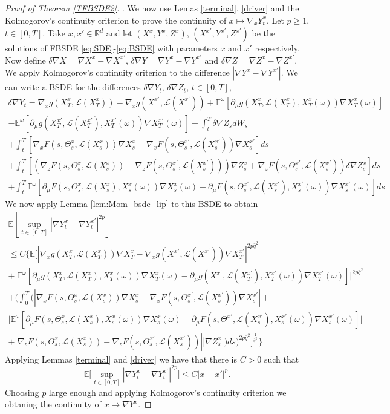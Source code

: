 \documentclass[12,english]{amsart}
\theoremstyle{plain}
\theoremstyle{definition}
\theoremstyle{plain}
\theoremstyle{plain}
\theoremstyle{remark}
\newcommand{\E}{\mathbb E}
\newcommand{\R}{\mathbb R}
\newcommand{\cL}{\mathcal L}
\newcommand{\de}{\delta}
\newcommand{\om}{\omega}
\newcommand{\Te}{\Theta}
\begin{document}
\begin{proof}[Proof of Theorem \ref{TFBSDE2}].
We now use Lemas \ref{terminal}, \ref{driver} and the Kolmogorov's continuity criterion
to prove the continuity of $x\mapsto\nabla_x Y^x_t$.
Let $p\ge 1$, $t \in[0,T]$. Take $x,x' \in\R^d$ and let  $(X^x,
Y^x,Z^x)$, $(X^{x'}, Y^{x'},Z^{x'})$ be
the solutions of FBSDE \eqref{eq:SDE}-\eqref{eq:BSDE} with parameters $x$ and $x'$
respectively. Now define $\de\nabla X = \nabla X^x-\nabla X^{x'}$,
$\de\nabla Y = \nabla Y^x-\nabla Y^{x'}$ and $\de\nabla Z = \nabla Z^x-\nabla Z^{x'}$.
We apply Kolmogorov's continuity criterion to
the difference $|\nabla Y^x - \nabla Y^{x'}|$.
We can write a BSDE for the differences $\de\nabla Y_t$, $\de\nabla Z_t$,
$t\in[0,T]$,
\begin{multline*}
    \de\nabla Y_t=\nabla_xg(X^x_T,\cL(X^x_T))-\nabla_xg(X^{x'},\cL(X^{x'}))
  +\E^\om[\partial_\mu g(X^x_T,\cL(X^x_T), X^x_T(\om))\nabla X^x_T(\om)]\\
  -\E^\om[\partial_\mu g(X^{x'}_T,\cL(X^{x'}_T), X^{x'}_T(\om))\nabla X^{x'}_T(\om)]-\int_t^T\de\nabla Z_s dW_s\\
  +\int_t^T[\nabla_xF(s,\Te^x_s,\cL(X^x_s))\nabla X^x_s- \nabla_xF(s,\Te^{x'}_s,\cL(X^{x'}_s))\nabla X^{x'}_s]ds\\
  +\int_t^T[(\nabla_zF(s,\Te^x_s,\cL(X^x_s))-\nabla_zF(s,\Te^{x'}_s,\cL(X^{x'}_s)))\nabla Z^x_s
  +\nabla_zF(s,\Te^{x'}_s,\cL(X^{x'}_s))\de\nabla Z^x_s]ds\\
  +  \int_t^T\E^\om[\partial_\mu F(s,\Te^x_s,\cL(X^x_s),X^x_s(\om))\nabla X^x_s(\om)
   -\partial_\mu F(s,\Te^{x'}_s,\cL(X^{x'}_s), X^{x'}_s(\om))\nabla X^{x'}_s(\om)]ds
 \end{multline*}
 We now apply Lemma \ref{lem:Mom_bsde_lip} to this BSDE to obtain
 \begin{multline*}
   \E[\sup_{t\in[0,T]}|\nabla Y_t^x-\nabla Y_t^{x'}|^{2p}]\\
\le C \Big\{\E \Big[|\nabla_xg(X^x_T,\cL(X^x_T)) \nabla X^x_T -\nabla_xg(X^{x'},\cL(X^{x'})) \nabla X^{x'}_T|^{2p\bar q^2} \\
+\big|\E^\om[\partial_\mu g(X^x_T,\cL(X^x_T), X^x_T(\om))\nabla X^x_T(\om)
  -\partial_\mu g(X^{x'},\cL(X^{x'}_T), X^{x'}_T(\om)) \nabla X^{x'}_T(\om)]\big|^{2p\bar q^2}\\
+\Big(\int_0^T(|\nabla_xF(s,\Te^x_s,\cL(X^x_s)) \nabla X^x_s
    -\nabla_xF(s,\Te_s ^{x'},\cL(X^{x'}_s)) \nabla X^{x'}_s|+\\
\big|\E^\om[\partial_\mu F(s,\Te^x_s,\cL(X^x_s), X^x_s(\om))\nabla X^x_s(\om)
  -\partial_\mu F(s,\Te^{x'},\cL(X^{x'}_s), X^{x'}_s(\om)) \nabla
  X^{x'}_s(\om)]\big|\\+|\nabla_zF(s,\Te^x_s,\cL(X^x_s))-\nabla_zF(s,\Te^{x'}_s,\cL(X^{x'}_s))||\nabla Z^x_s|
  )ds\Big)^{2p\bar q^2}\Big]^\frac 1{\bar q^2}\Big\}
\end{multline*}
Applying Lemmas \ref{terminal} and \ref{driver} we have that there
is $C>0$ such that
\[ \E\Big[\sup_{t\in[0,T]}|\nabla Y_t^x-\nabla Y_t^{x'}|^{2p}\Big]\le C|x-x'|^p.\]
Choosing $p$ large enough and applying Kolmogorov's continuity
criterion we obtaning the continuity of $x\mapsto \nabla Y^x$.
\end{proof}
\end{document}

